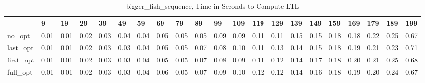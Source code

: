 \begin{table}
\caption{bigger_fish_sequence, Time in Seconds to Compute LTL}
\label{bigger_fish_sequence_LTL_time}
\begin{tabular}{lllllllllllllllllllll}
\toprule
 & 9 & 19 & 29 & 39 & 49 & 59 & 69 & 79 & 89 & 99 & 109 & 119 & 129 & 139 & 149 & 159 & 169 & 179 & 189 & 199 \\
\midrule
no_opt & 0.01 & 0.01 & 0.02 & 0.03 & 0.04 & 0.04 & 0.05 & 0.05 & 0.05 & 0.09 & 0.09 & 0.11 & 0.11 & 0.15 & 0.15 & 0.18 & 0.18 & 0.22 & 0.25 & 0.67 \\
last_opt & 0.01 & 0.01 & 0.02 & 0.03 & 0.03 & 0.04 & 0.05 & 0.05 & 0.07 & 0.08 & 0.10 & 0.11 & 0.13 & 0.14 & 0.15 & 0.18 & 0.19 & 0.21 & 0.23 & 0.71 \\
first_opt & 0.01 & 0.01 & 0.02 & 0.03 & 0.03 & 0.04 & 0.05 & 0.05 & 0.07 & 0.08 & 0.09 & 0.11 & 0.12 & 0.14 & 0.17 & 0.18 & 0.20 & 0.21 & 0.25 & 0.68 \\
full_opt & 0.01 & 0.01 & 0.02 & 0.03 & 0.03 & 0.04 & 0.06 & 0.05 & 0.07 & 0.09 & 0.10 & 0.12 & 0.12 & 0.14 & 0.16 & 0.18 & 0.19 & 0.20 & 0.24 & 0.67 \\
\bottomrule
\end{tabular}
\end{table}
